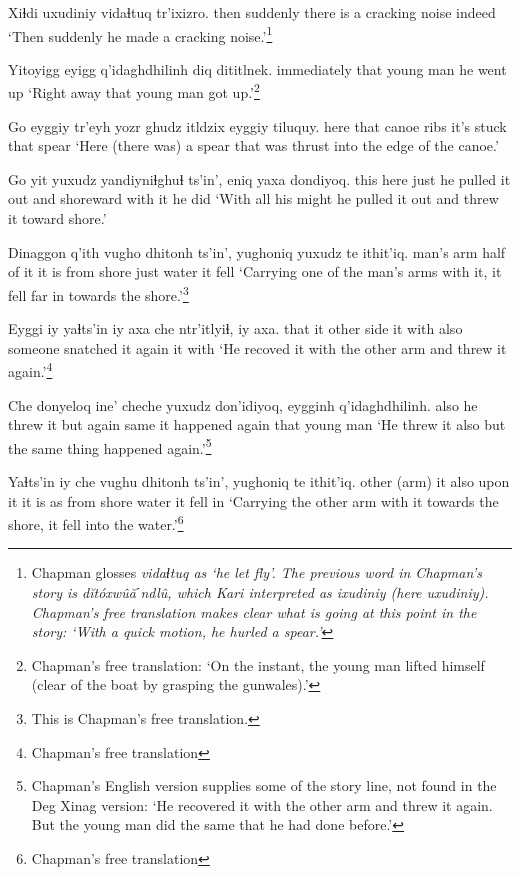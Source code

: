 \documentclass[12pt]{article}
\begin{document}
\gll Xiɬdi uxudiniy vidaɬtuq   tr'ixizro.
then suddenly {there is a cracking noise} indeed
\glt `Then suddenly he made a cracking noise.'\footnote{Chapman glosses \em vidaɬtuq \em as `he let fly'.  The previous word in Chapman's story is \em d\u{i}t\'oxw\^u\u{a}ˊndl\^{u}, \em which Kari interpreted as \em ixudiniy (\em here \em uxudiniy).  Chapman's free translation makes clear what is going at this point in the story:  `With a quick motion, he hurled a spear.'}
\glend

\gll Yitoyigg eyigg q'idaghdhilinh {diq dititlnek.}
immediately that {young man} {he went up}
\glt `Right away that young man got up.'\footnote{Chapman's free translation:  `On the instant, the young man lifted himself (clear of the boat by grasping the gunwales).'}
\glend

\gll Go eyggiy {tr'eyh yozr} ghudz itldzix eyggiy tiluquy.
here that  canoe  ribs {it's stuck} that spear
\glt `Here (there was) a spear that was thrust into the edge of the canoe.'
\glend

\gll Go yit yuxudz  yandiyniɬghuɬ ts'in',  eniq  yaxa dondiyoq.
this here just {he pulled it out}  and  shoreward {with it} {he did}
\glt `With all his might he pulled it out and threw it toward shore.'
\glend

\gll Dinaggon q'ith vugho dhitonh ts'in', yughoniq yuxudz te ithit'iq.
{man's arm} half {of it} {it is} {} {from shore} just water {it fell}
\glt `Carrying one of the man's arms with it, it fell far in towards the shore.'\footnote{This is Chapman's free translation.}
\glend

\gll Eyggi iy yaɬts'in iy axa che ntr'itlyiɬ, iy axa.
that it {other side}  it with also {someone snatched it again} it with
\glt `He recoved it with the other arm and threw it again.'\footnote{Chapman's free translation}
\glend

\gll Che donyeloq ine' cheche yuxudz don'idiyoq, eygginh q'idaghdhilinh.
also {he threw it} but again same {it happened again} that  {young man}
\glt `He threw it also but the same thing happened again.'\footnote{Chapman's English version supplies some of the story line, not found in the Deg Xinag version: `He recovered it with the other arm and threw it again. But the young man did the same that he had done before.'}
\glend

\gll Yaɬts'in iy che vughu dhitonh ts'in', yughoniq te  ithit'iq.
{other (arm)} it also {upon it} {it is} as {from shore} water {it fell in}
\glt `Carrying the other arm with it towards the shore, it fell into the water.'\footnote{Chapman's free translation}
\glend
\end{document}
